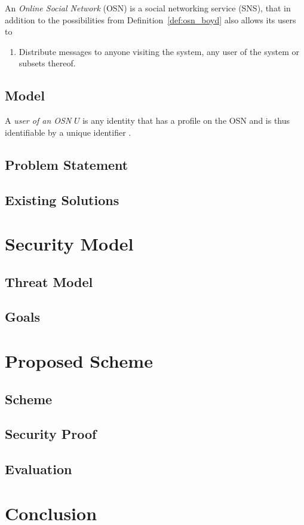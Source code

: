 \begin{defn}[OSN]
\label{def:osn}
 An \textit{Online Social Network} (OSN) is a social networking service (SNS), that in addition to the possibilities from Definition~\ref{def:osn_boyd} also allows its users to
 \begin{enumerate}
  \setcounter{enumi}{\theenumTemp}
  \item Distribute messages to anyone visiting the system, any user of the system or subsets thereof.
 \end{enumerate}
\end{defn}


\subsection{Model}

\begin{defn}
\label{def:user}
 A \textit{user of an OSN} $U$ is any identity that has a profile on the OSN and is thus identifiable by a unique identifier . 
\end{defn}



\subsection{Problem Statement}

\subsection{Existing Solutions}

\section{Security Model}

\subsection{Threat Model}

\subsection{Goals}

\section{Proposed Scheme}

\subsection{Scheme}

\subsection{Security Proof}

\subsection{Evaluation}

\section{Conclusion}

